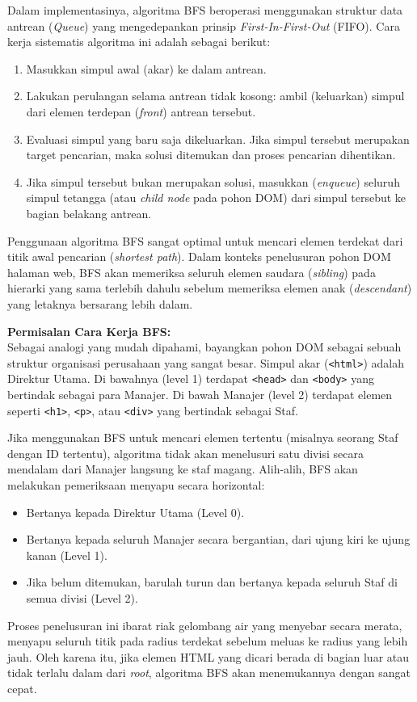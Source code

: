 \documentclass[12pt]{article}
\begin{document}
Dalam implementasinya, algoritma BFS beroperasi menggunakan struktur data antrean (\textit{Queue}) yang mengedepankan prinsip \textit{First-In-First-Out} (FIFO). Cara kerja sistematis algoritma ini adalah sebagai berikut:
\begin{enumerate}
    \item Masukkan simpul awal (akar) ke dalam antrean.
    \item Lakukan perulangan selama antrean tidak kosong: ambil (keluarkan) simpul dari elemen terdepan (\textit{front}) antrean tersebut.
    \item Evaluasi simpul yang baru saja dikeluarkan. Jika simpul tersebut merupakan target pencarian, maka solusi ditemukan dan proses pencarian dihentikan.
    \item Jika simpul tersebut bukan merupakan solusi, masukkan (\textit{enqueue}) seluruh simpul tetangga (atau \textit{child node} pada pohon DOM) dari simpul tersebut ke bagian belakang antrean.
\end{enumerate}

Penggunaan algoritma BFS sangat optimal untuk mencari elemen terdekat dari titik awal pencarian (\textit{shortest path}). Dalam konteks penelusuran pohon DOM halaman web, BFS akan memeriksa seluruh elemen saudara (\textit{sibling}) pada hierarki yang sama terlebih dahulu sebelum memeriksa elemen anak (\textit{descendant}) yang letaknya bersarang lebih dalam.

\vspace{0.3cm}
\noindent\textbf{Permisalan Cara Kerja BFS:} \\
Sebagai analogi yang mudah dipahami, bayangkan pohon DOM sebagai sebuah struktur organisasi perusahaan yang sangat besar. Simpul akar (\verb|<html>|) adalah Direktur Utama. Di bawahnya (level 1) terdapat \verb|<head>| dan \verb|<body>| yang bertindak sebagai para Manajer. Di bawah Manajer (level 2) terdapat elemen seperti \verb|<h1>|, \verb|<p>|, atau \verb|<div>| yang bertindak sebagai Staf.

Jika menggunakan BFS untuk mencari elemen tertentu (misalnya seorang Staf dengan ID tertentu), algoritma tidak akan menelusuri satu divisi secara mendalam dari Manajer langsung ke staf magang. Alih-alih, BFS akan melakukan pemeriksaan menyapu secara horizontal:
\begin{itemize}
    \item Bertanya kepada Direktur Utama (Level 0).
    \item Bertanya kepada seluruh Manajer secara bergantian, dari ujung kiri ke ujung kanan (Level 1).
    \item Jika belum ditemukan, barulah turun dan bertanya kepada seluruh Staf di semua divisi (Level 2).
\end{itemize}
Proses penelusuran ini ibarat riak gelombang air yang menyebar secara merata, menyapu seluruh titik pada radius terdekat sebelum meluas ke radius yang lebih jauh. Oleh karena itu, jika elemen HTML yang dicari berada di bagian luar atau tidak terlalu dalam dari \textit{root}, algoritma BFS akan menemukannya dengan sangat cepat.
\end{document}
